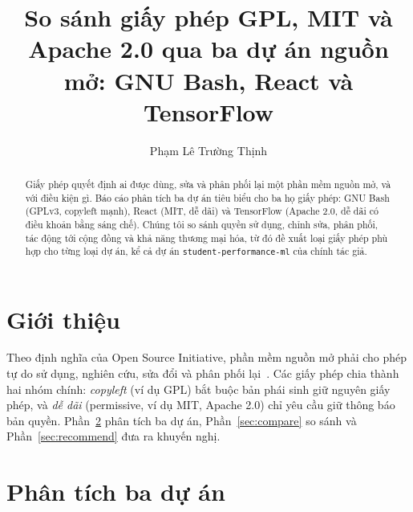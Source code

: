 \documentclass[runningheads]{llncs}
\begin{document}
\title{So sánh giấy phép GPL, MIT và Apache 2.0 qua ba dự án nguồn mở: GNU Bash, React và TensorFlow}
\author{Phạm Lê Trường Thịnh}
\maketitle

\begin{abstract}
Giấy phép quyết định ai được dùng, sửa và phân phối lại một phần mềm nguồn mở, và với điều
kiện gì. Báo cáo phân tích ba dự án tiêu biểu cho ba họ giấy phép: GNU Bash (GPLv3, copyleft
mạnh), React (MIT, dễ dãi) và TensorFlow (Apache 2.0, dễ dãi có điều khoản bằng sáng chế).
Chúng tôi so sánh quyền sử dụng, chỉnh sửa, phân phối, tác động tới cộng đồng và khả năng
thương mại hóa, từ đó đề xuất loại giấy phép phù hợp cho từng loại dự án, kể cả dự án
\texttt{student-performance-ml} của chính tác giả.
\end{abstract}

\section{Giới thiệu}\label{sec:intro}
Theo định nghĩa của Open Source Initiative, phần mềm nguồn mở phải cho phép tự do sử dụng,
nghiên cứu, sửa đổi và phân phối lại~\cite{osd}. Các giấy phép chia thành hai nhóm chính:
\emph{copyleft} (ví dụ GPL) bắt buộc bản phái sinh giữ nguyên giấy phép, và \emph{dễ dãi}
(permissive, ví dụ MIT, Apache 2.0) chỉ yêu cầu giữ thông báo bản quyền. Phần~\ref{sec:projects}
phân tích ba dự án, Phần~\ref{sec:compare} so sánh và Phần~\ref{sec:recommend} đưa ra khuyến nghị.

\section{Phân tích ba dự án}\label{sec:projects}
\end{document}
